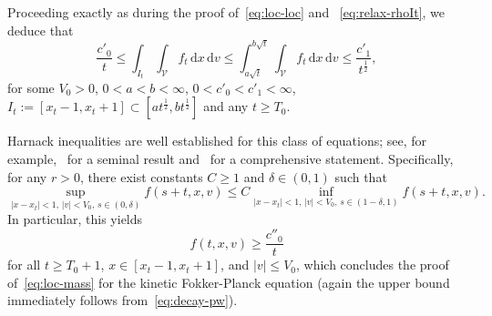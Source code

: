 \documentclass[11pt]{amsart}
\theoremstyle{definition}
\theoremstyle{remark}
\numberwithin{equation}{section}
\def\VV{{\mathcal V}}
\newcommand{\dd}{{\, \mathrm d}}
\newcommand{\sfL}{\mathsf{L}}
\begin{document}


 Proceeding exactly as during the proof of~\eqref{eq:loc-loc} and ~\eqref{eq:relax-rhoIt}, we deduce that 
 \begin{equation}
   \label{eq:kFP-rhoItBIS}
   \frac{c'_0}{t} \le \int_{I_t} \! \int_{\VV} f_t \dd x \dd v \le   \int_{a \sqrt{t}}^{b \sqrt{t}}  \! \int_{\VV} f_t \dd x \dd v \le  \frac{c'_1}{t^{\frac{1}{2}}},
 \end{equation}
 for some $V_0>0$, $0<a<b<\infty$, $0<c'_0<c'_1<\infty$, $I_t := \left[x_t - 1,x_t+ 1 \right] \subset [at^{\frac{1}{2}},bt^{\frac{1}{2}}]$ and any $t \ge T_0$. 
 
 
 Harnack inequalities are well established for this class of equations; see, for example,~\cite[Theorem~5.1]{bony_1969} for a seminal result and~\cite[Theorem~5.1]{Lanconelli_1994} for a comprehensive statement. Specifically, for any $r > 0$, there exist constants $C \geq 1$ and $\delta \in (0,1)$ such that
 \begin{equation*}
   \sup_{|x-x_t| < 1,\, |v| < V_0,\, s \in (0,\delta)} f(s+t,x,v) \leq C
   \inf_{|x-x_t| < 1,\, |v| < V_0,\, s \in (1-\delta,1)} f(s+t,x,v).
 \end{equation*}
 In particular, this yields
 \begin{equation*}
   f(t,x,v) \geq \frac{c''_0}{t}
 \end{equation*}
 for all $t \geq T_0 + 1$, $x \in [x_t - 1, x_t + 1]$, and $|v| \leq V_0$, which concludes the proof of~\eqref{eq:loc-mass} for the kinetic Fokker-Planck equation (again the upper bound immediately follows from~\eqref{eq:decay-pw}).
\end{document}
